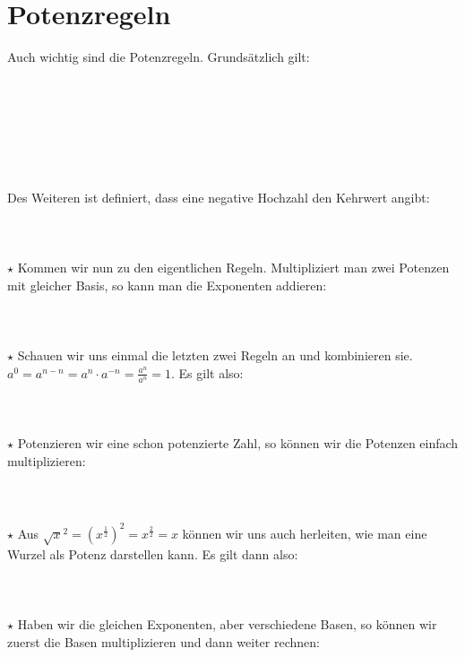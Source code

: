 \section{Potenzregeln}
	Auch wichtig sind die Potenzregeln. Grundsätzlich gilt:
	\\ \\
	\formel{\[\underbrace{a\cdot a\cdot a\cdot\ldots\cdot a}_{n-Mal}=a^n\]}
	\\ \\ \\ \\ \\ \\
	Des Weiteren ist definiert, dass eine negative Hochzahl den Kehrwert angibt:
	\\ \\
	\formel{\[\frac{1}{x^n}=x^{-n}\]}
	\\ \\
	\(\star\) Kommen wir nun zu den eigentlichen Regeln. Multipliziert man zwei
	Potenzen mit gleicher Basis, so kann man die Exponenten addieren:
	\\ \\
	\formel{\[a^m\cdot a^n=a^{m+n}\]}
	\\ \\
	\(\star\) Schauen wir uns einmal die letzten zwei Regeln an und kombinieren
	sie. \(a^0=a^{n-n}=a^n\cdot a^{-n}=\frac{a^n}{a^n}=1\). Es gilt also:
	\\ \\
	\formel{\[a^0=1,\text{ für }a\neq 0\]}
	\\ \\
	\(\star\) Potenzieren wir eine schon potenzierte
	Zahl, so können wir die Potenzen einfach multiplizieren:
	\\ \\
	\formel{\[\left ( a^n \right )^m=a^{n\cdot m}\]}
	\\ \\
	\(\star\) Aus \(\sqrt{x}^2=\left ( x^{\frac{1}{2}}\right
	)^2=x^{\frac{2}{2}}=x\) können wir uns auch herleiten, wie man eine Wurzel als
	Potenz darstellen kann. Es gilt dann also:
	\\ \\
	\formel{\[\sqrt[n]{x}=x^{\frac{1}{n}}\]}
	\\ \\
	\(\star\) Haben wir die gleichen Exponenten, aber verschiedene Basen, so können
	wir zuerst die Basen multiplizieren und dann weiter rechnen:
	\\ \\
	\formel{\[a^n\cdot b^n=(a\cdot b)^n, \textrm{\ bzw\ } \frac{a^n}{b^n}=\left (
	\frac{a}{b}\right ) ^n\]}
